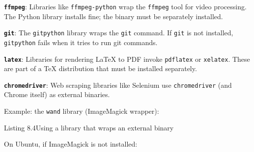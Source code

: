 \textbf{\texttt{ffmpeg}}: Libraries like \texttt{ffmpeg-python} wrap the \texttt{ffmpeg} tool for video processing. The Python library installs fine; the binary must be separately installed.

\textbf{\texttt{git}}: The \texttt{gitpython} library wraps the \texttt{git} command. If \texttt{git} is not installed, \texttt{gitpython} fails when it tries to run git commands.

\textbf{\texttt{latex}}: Libraries for rendering LaTeX to PDF invoke \texttt{pdflatex} or \texttt{xelatex}. These are part of a TeX distribution that must be installed separately.

\textbf{\texttt{chromedriver}}: Web scraping libraries like Selenium use \texttt{chromedriver} (and Chrome itself) as external binaries.

Example: the \texttt{wand} library (ImageMagick wrapper):

\begin{codeboxcap}[short]{\textcolor{accent}{Listing 8.4}\enspace Using a library that wraps an external binary}

\begin{Shaded}
\begin{Highlighting}[]

\NormalTok{) }\OperatorTok{{-}\textgreater{}} \NormalTok{:}
    \OperatorTok{=}
\NormalTok{, }\NormalTok{)}
\end{Highlighting}
\end{Shaded}

\end{codeboxcap}

\noindent{}On Ubuntu, if ImageMagick is not installed:

\begin{codebox}[short]

\begin{Shaded}
\begin{Highlighting}[]
  
\end{Highlighting}
\end{Shaded}

\end{codebox}

